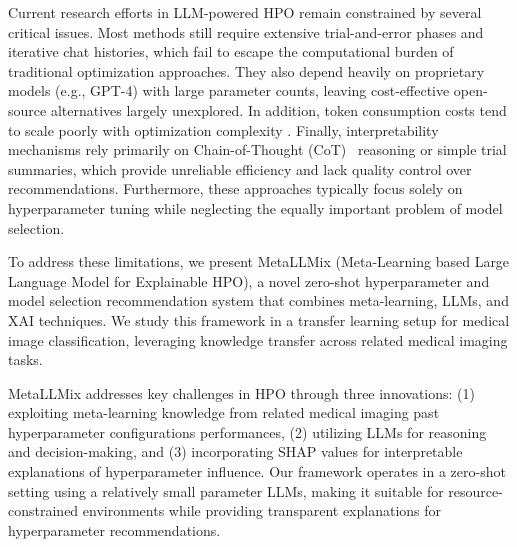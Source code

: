 \documentclass{article}
\begin{document}
Current research efforts in LLM-powered HPO remain constrained by several critical issues. Most methods still require extensive trial-and-error phases and iterative chat histories, which fail to escape the computational burden of traditional optimization approaches. They also depend heavily on proprietary models (e.g., GPT-4) with large parameter counts, leaving cost-effective open-source alternatives largely unexplored. In addition, token consumption costs tend to scale poorly with optimization complexity \cite{yang2023large}. Finally, interpretability mechanisms rely primarily on Chain-of-Thought (CoT)~\cite{wei2022chain} reasoning or simple trial summaries, which provide unreliable efficiency and lack quality control over recommendations. Furthermore, these approaches typically focus solely on hyperparameter tuning while neglecting the equally important problem of model selection.

To address these limitations, we present MetaLLMix (Meta-Learning based Large Language Model for Explainable HPO), a novel zero-shot hyperparameter and model selection recommendation system that combines meta-learning, LLMs, and XAI techniques. We study this framework in a transfer learning setup for medical image classification, leveraging knowledge transfer across related medical imaging tasks.

MetaLLMix addresses key challenges in HPO through three innovations: (1) exploiting meta-learning knowledge from related medical imaging past hyperparameter configurations performances, (2) utilizing LLMs for reasoning and decision-making, and (3) incorporating SHAP values for interpretable explanations of hyperparameter influence. Our framework operates in a zero-shot setting using a relatively small parameter LLMs, making it suitable for resource-constrained environments while providing transparent explanations for hyperparameter recommendations.
\end{document}
